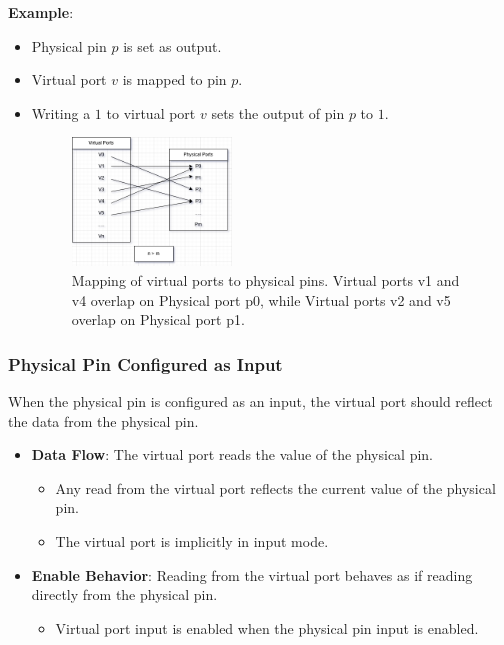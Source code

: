 \textbf{Example}:
\begin{itemize}[noitemsep]
    \item Physical pin $p$ is set as output.
    \item Virtual port $v$ is mapped to pin $p$.
    \item Writing a $1$ to virtual port $v$ sets the output of pin $p$ to $1$.
    \begin{figure}[h]
        \centering
        \includegraphics[width=0.4\textwidth]{images/virtual_ports_diagram.png}
        \caption{Mapping of virtual ports to physical pins. Virtual ports v1 and v4 overlap on 
        Physical port p0, while Virtual ports v2 and v5 overlap on Physical port p1.}
      \end{figure}
\end{itemize}

\subsubsection{Physical Pin Configured as Input}
When the physical pin is configured as an input, the virtual port should reflect the data from the physical pin.

\begin{itemize}[noitemsep]
    \item \textbf{Data Flow}: The virtual port reads the value of the physical pin.
    \begin{itemize}[noitemsep]
        \item Any read from the virtual port reflects the current value of the physical pin.
        \item The virtual port is implicitly in input mode.
    \end{itemize}
    \item \textbf{Enable Behavior}: Reading from the virtual port behaves as if reading directly from the physical pin.
    \begin{itemize}[noitemsep]
        \item Virtual port input is enabled when the physical pin input is enabled.
    \end{itemize}
\end{itemize}

